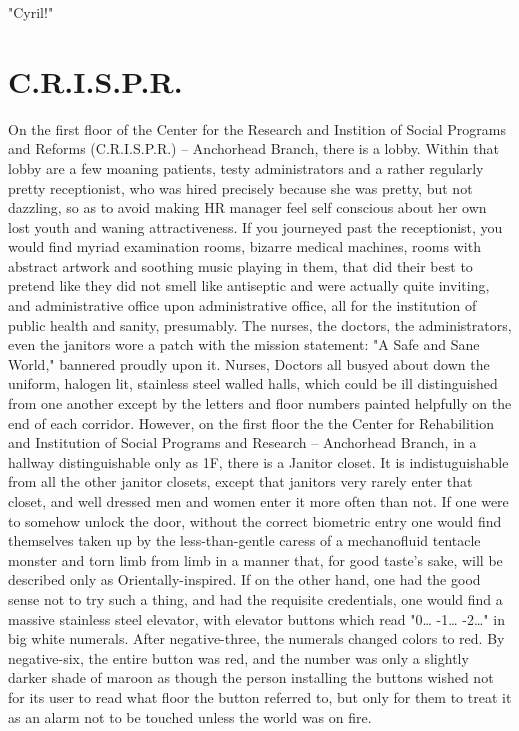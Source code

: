 \documentclass[12pt]{book}
\begin{document}
"Cyril!"

\section*{C.R.I.S.P.R.}
\label{sec:orgc83f1c7}

On the first floor of the Center for the Research and Instition of Social Programs and Reforms (C.R.I.S.P.R.) -- Anchorhead Branch, there is a lobby. Within that lobby are a few moaning patients, testy administrators and a rather regularly pretty receptionist, who was hired precisely because she was pretty, but not dazzling, so as to avoid making HR manager feel self conscious about her own lost youth and waning attractiveness. If you journeyed past the receptionist, you would find myriad examination rooms, bizarre medical machines, rooms with abstract artwork and soothing music playing in them, that did their best to pretend like they did not smell like antiseptic and were actually quite inviting, and administrative office upon administrative office, all for the institution of public health and sanity, presumably. The nurses, the doctors, the administrators, even the janitors wore a patch with the mission statement: "A Safe and Sane World," bannered proudly upon it. Nurses, Doctors all busyed about down the uniform, halogen lit, stainless steel walled halls, which could be ill distinguished from one another except by the letters and floor numbers painted helpfully on the end of each corridor. However, on the first floor the the Center for Rehabilition and Institution of Social Programs and Research -- Anchorhead Branch, in a hallway distinguishable only as 1F, there is a Janitor closet. It is indistuguishable from all the other janitor closets, except that janitors very rarely enter that closet, and well dressed men and women enter it more often than not. If one were to somehow unlock the door, without the correct biometric entry one would find themselves taken up by the less-than-gentle caress of a mechanofluid tentacle monster and torn limb from limb in a manner that, for good taste's sake, will be described only as Orientally-inspired. If on the other hand, one had the good sense not to try such a thing, and had the requisite credentials, one would find a massive stainless steel elevator, with elevator buttons which read "0\ldots{} -1\ldots{} -2\ldots{}" in big white numerals. After negative-three, the numerals changed colors to red. By negative-six, the entire button was red, and the number was only a slightly darker shade of maroon as though the person installing the buttons wished not for its user to read what floor the button referred to, but only for them to treat it as an alarm not to be touched unless the world was on fire.
\end{document}
